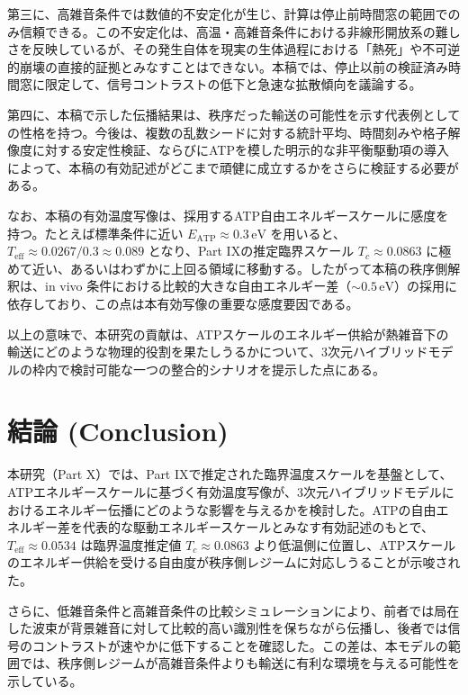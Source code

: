 \documentclass[a4paper,11pt,ja=standard,lualatex]{bxjsarticle}
\begin{document}
第三に、高雑音条件では数値的不安定化が生じ、計算は停止前時間窓の範囲でのみ信頼できる。この不安定化は、高温・高雑音条件における非線形開放系の難しさを反映しているが、その発生自体を現実の生体過程における「熱死」や不可逆的崩壊の直接的証拠とみなすことはできない。本稿では、停止以前の検証済み時間窓に限定して、信号コントラストの低下と急速な拡散傾向を議論する。

第四に、本稿で示した伝播結果は、秩序だった輸送の可能性を示す代表例としての性格を持つ。今後は、複数の乱数シードに対する統計平均、時間刻みや格子解像度に対する安定性検証、ならびにATPを模した明示的な非平衡駆動項の導入によって、本稿の有効記述がどこまで頑健に成立するかをさらに検証する必要がある。

なお、本稿の有効温度写像は、採用するATP自由エネルギースケールに感度を持つ。たとえば標準条件に近い $E_{\mathrm{ATP}} \approx 0.3\,\mathrm{eV}$ を用いると、$T_{\mathrm{eff}} \approx 0.0267/0.3 \approx 0.089$ となり、Part IXの推定臨界スケール $T_c \approx 0.0863$ に極めて近い、あるいはわずかに上回る領域に移動する。したがって本稿の秩序側解釈は、in vivo 条件における比較的大きな自由エネルギー差（$\sim 0.5\,\mathrm{eV}$）の採用に依存しており、この点は本有効写像の重要な感度要因である。

以上の意味で、本研究の貢献は、ATPスケールのエネルギー供給が熱雑音下の輸送にどのような物理的役割を果たしうるかについて、3次元ハイブリッドモデルの枠内で検討可能な一つの整合的シナリオを提示した点にある。

\section{結論 (Conclusion)}
\label{sec:conclusion}
本研究（Part X）では、Part IXで推定された臨界温度スケールを基盤として、ATPエネルギースケールに基づく有効温度写像が、3次元ハイブリッドモデルにおけるエネルギー伝播にどのような影響を与えるかを検討した。ATPの自由エネルギー差を代表的な駆動エネルギースケールとみなす有効記述のもとで、$T_{\mathrm{eff}} \approx 0.0534$ は臨界温度推定値 $T_c \approx 0.0863$ より低温側に位置し、ATPスケールのエネルギー供給を受ける自由度が秩序側レジームに対応しうることが示唆された。

さらに、低雑音条件と高雑音条件の比較シミュレーションにより、前者では局在した波束が背景雑音に対して比較的高い識別性を保ちながら伝播し、後者では信号のコントラストが速やかに低下することを確認した。この差は、本モデルの範囲では、秩序側レジームが高雑音条件よりも輸送に有利な環境を与える可能性を示している。
\end{document}
